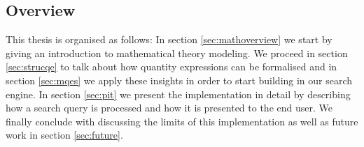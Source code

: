 
\subsection{Overview}

This thesis is organised as follows: In section \ref{sec:mathoverview} we start by giving an introduction to mathematical theory modeling. We proceed in section \ref{sec:strucqe} to talk about how quantity expressions can be formalised and in section \ref{sec:mqes} we apply these insights in order to start building in our search engine. In section \ref{sec:pit} we present the implementation in detail by describing how a search query is processed and how it is presented to the end user. We finally conclude with discussing the limits of this implementation as well as future work in section \ref{sec:future}. 
